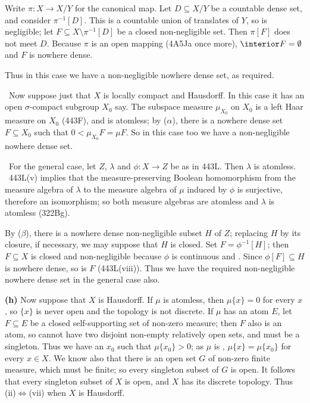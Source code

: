 {Write $\pi:X\to X/Y$ for the canonical map.
Let $D\subseteq X/Y$ be a countable dense set, and consider $\pi^{-1}[D]$.
This is a countable union of
translates of $Y$, so is negligible;  let
$F\subseteq X\setminus\pi^{-1}[D]$
be a closed non-negligible set.   Then $\pi[F]$ does not meet $D$.
Because $\pi$ is an open mapping (4A5Ja once more),
$\interior F=\emptyset$ and $F$ is nowhere dense.

Thus in this case we have a non-negligible nowhere dense set, as required.

\medskip

\quad\grheadb\ Now suppose just that $X$ is locally compact and Hausdorff.   In
this case it has an open $\sigma$-compact subgroup $X_0$ say.
The subspace measure $\mu_{X_0}$
on $X_0$ is a left Haar measure on $X_0$ (443F), and
is atomless;  by ($\alpha$),
there is a nowhere dense set $F\subseteq X_0$ such
that $0<\mu_{X_0}F=\mu F$.   So in this case too we have a non-negligible
nowhere dense set.

\medskip

\quad\grheadc\
For the general case, let $Z$, $\lambda$ and $\phi:X\to Z$ be as
in 443L.   Then $\lambda$ is atomless.   \Prf\ 443L(v) implies that
the measure-preserving Boolean
homomorphism from the measure algebra of $\lambda$ to the measure
algebra of $\mu$ induced by $\phi$ is surjective, therefore an isomorphism;
so both measure algebras are atomless and $\lambda$ is atomless (322Bg).\
\Qed

By ($\beta$), there is a nowhere dense non-negligible subset $H$ of $Z$;
replacing $H$ by its closure, if necessary, we may suppose that $H$ is
closed.   Set $F=\phi^{-1}[H]$;  then $F\subseteq X$ is closed and
non-negligible because $\phi$ is continuous and \imp.   Since
$\phi[F]\subseteq H$ is nowhere dense, so is $F$ (443L(viii)).
Thus we have the required non-negligible nowhere dense set in the general
case also.

\medskip

{\bf (h)} Now suppose that $X$ is Hausdorff.   If $\mu$ is atomless, then
$\mu\{x\}=0$ for every $x$, so $\{x\}$ is never open and the topology is
not discrete.   If $\mu$ has an atom $E$, let $F\subseteq E$ be a closed
self-supporting set of non-zero measure;  then $F$ also is an atom, so
cannot have two disjoint non-empty relatively open sets, and must be a
singleton.   Thus we have an $x_0$ such that $\mu\{x_0\}>0$;  as $\mu$ is
\lti, $\mu\{x\}=\mu\{x_0\}$ for every $x\in X$.
We know also that there is an open set $G$ of non-zero finite measure,
which must be finite;  so every singleton subset of $G$ is open.   It
follows that every singleton subset of $X$ is open, and $X$ has its
discrete topology.   Thus (ii)$\Leftrightarrow$(vii) when $X$ is Hausdorff.
}%


